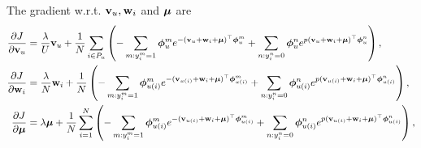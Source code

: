 The gradient w.r.t. $\mathbf{v}_u, \mathbf{w}_i$ and $\bm{\mu}$ are
\begin{equation*}
\begin{aligned}
\frac{\partial J}{\partial \mathbf{v}_u}
&= \frac{\lambda}{U} \mathbf{v}_u + \frac{1}{N} \sum_{i \in P_u} \left( 
   - \sum_{m: y_i^m = 1} \bm{\phi}_u^m e^{-(\mathbf{v}_{u} + \mathbf{w}_i + \bm{\mu})^\top \bm{\phi}_u^m} 
   + \sum_{n: y_i^n = 0} \bm{\phi}_u^n e^{p (\mathbf{v}_{u} + \mathbf{w}_i + \bm{\mu})^\top \bm{\phi}_u^n} \right), \\
\frac{\partial J}{\partial \mathbf{w}_i}
&= \frac{\lambda}{N} \mathbf{w}_i + \frac{1}{N} \left( 
   - \sum_{m: y_i^m = 1} \bm{\phi}_{u(i)}^m e^{-(\mathbf{v}_{u(i)} + \mathbf{w}_i + \bm{\mu})^\top \bm{\phi}_{u(i)}^m} 
   + \sum_{n: y_i^n = 0} \bm{\phi}_{u(i)}^n e^{p (\mathbf{v}_{u(i)} + \mathbf{w}_i + \bm{\mu})^\top \bm{\phi}_{u(i)}^n} \right), \\
\frac{\partial J}{\partial \bm{\mu}}
&= \lambda \bm{\mu} + \frac{1}{N} \sum_{i=1}^N \left( 
   - \sum_{m: y_i^m = 1} \bm{\phi}_{u(i)}^m e^{-(\mathbf{v}_{u(i)} + \mathbf{w}_i + \bm{\mu})^\top \bm{\phi}_{u(i)}^m} 
   + \sum_{n: y_i^n = 0} \bm{\phi}_{u(i)}^n e^{p (\mathbf{v}_{u(i)} + \mathbf{w}_i + \bm{\mu})^\top \bm{\phi}_{u(i)}^n} \right), \\
\end{aligned}
\end{equation*}
